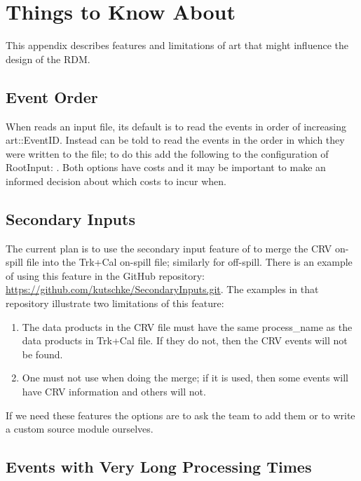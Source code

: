 \chapter{Things to Know About \art}
\label{app:Aboutart}

This appendix describes features and limitations of art that might influence the design
of the RDM.

\section{Event Order }
\label{appsec:EventOrder}

When \art reads an input file, its default is to read the events in order of increasing {\code art::EventID}.
Instead \art can be told to read the events in the order in which they were written to the file; to do this
add the following to the configuration of {\code RootInput}: .
Both options have costs and it may be important to make an informed decision about which costs to incur when.

\section{Secondary Inputs}
\label{appsec:SecondaryInputs}

The current plan is to use the secondary input feature of \art to merge the CRV on-spill file
into the Trk+Cal on-spill file; similarly for off-spill. There is an example of using this feature in the GitHub repository:
\href{https://github.com/kutschke/SecondaryInputs.git}{https://github.com/kutschke/SecondaryInputs.git}.
The examples in that repository illustrate two limitations of this feature:

\begin{enumerate}
\item The data products in the CRV file must have the same process\_name as the data products in Trk+Cal file.
  If they do not, then the CRV events will not be found.
\item One must not use  when doing the merge;
  if it is used, then some events will have CRV information and others will not.
\end{enumerate}

If we need these features the options are to ask the \art team to add them or to write a custom source
module ourselves.

\section{Events with Very Long Processing Times}

